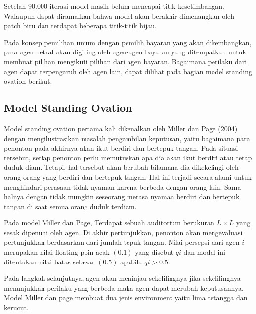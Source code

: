 Setelah 90.000 iterasi model masih belum mencapai titik kesetimbangan. Walaupun dapat diramalkan bahwa model akan berakhir dimenangkan oleh patch biru dan terdapat beberapa titik-titik hijau.

Pada konsep pemilihan umum dengan pemilih bayaran yang akan dikembangkan, para agen netral akan digiring oleh agen-agen bayaran yang ditempatkan untuk membuat pilihan mengikuti pilihan dari agen bayaran. Bagaimana perilaku dari agen dapat terpengaruh oleh agen lain, dapat dilihat pada bagian model standing ovation berikut.

\subsection{Model Standing Ovation}

Model standing ovation pertama kali dikenalkan oleh Miller dan Page (2004) dengan mengilustrasikan masalah pengambilan keputusan, yaitu bagaimana para penonton pada akhirnya akan ikut berdiri dan bertepuk tangan. Pada situasi tersebut, setiap penonton perlu memutuskan apa dia akan ikut berdiri atau tetap duduk diam. Tetapi, hal tersebut akan berubah bilamana dia dikekelingi oleh orang-orang yang berdiri dan bertepuk tangan. Hal ini terjadi secara alami untuk menghindari perasaan tidak nyaman karena berbeda dengan orang lain. Sama halnya dengan tidak mungkin seseorang merasa nyaman berdiri dan bertepuk tangan di saat semua orang duduk terdiam.

Pada model Miller dan Page, Terdapat sebuah auditorium berukuran $L \times L$ yang sesak dipenuhi oleh agen. Di akhir pertunjukkan, penonton akan mengevaluasi pertunjukkan berdasarkan dari jumlah tepuk tangan. Nilai persepsi dari agen $i$ merupakan nilai floating poin acak $\left( 0.1 \right) $ yang disebut $qi$ dan model ini ditentukan nilai batas sebesar $\left( 0.5 \right)$ apabila $qi > 0.5$.

Pada langkah selanjutnya, agen akan meninjau sekelilingnya jika sekelilingnya menunjukkan perilaku yang berbeda maka agen dapat merubah keputusannya. Model Miller dan page membuat dua jenis environment yaitu lima tetangga dan kerucut.

